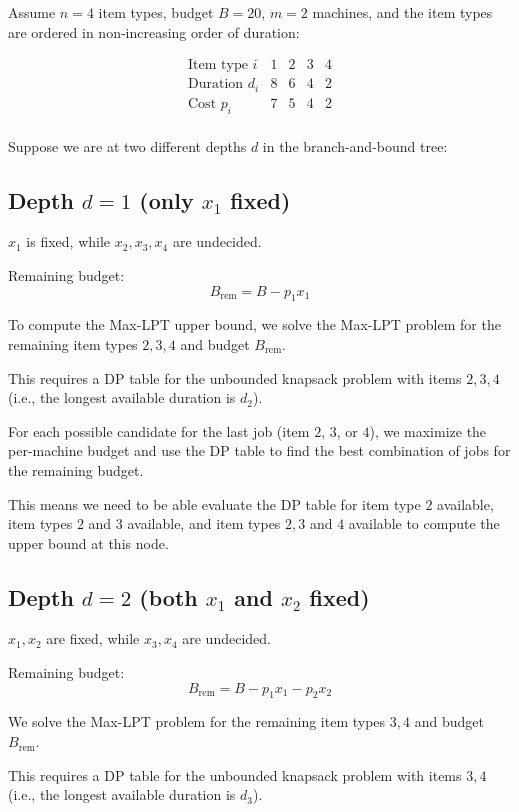 Assume $n = 4$ item types, budget $B = 20$, $m = 2$ machines, and the item types are ordered in non-increasing order of duration:

\[
\begin{array}{c|cccc}
\text{Item type } i & 1 & 2 & 3 & 4 \\
\hline
\text{Duration } d_i & 8 & 6 & 4 & 2 \\
\text{Cost } p_i & 7 & 5 & 4 & 2 \\
\end{array}
\]

Suppose we are at two different depths $d$ in the branch-and-bound tree:

\subsection*{Depth $d = 1$ (only $x_1$ fixed)}

$x_1$ is fixed, while $x_2, x_3, x_4$ are undecided.

Remaining budget:
\[
B_{\text{rem}} = B - p_1 x_1
\]

To compute the Max-LPT upper bound, we solve the Max-LPT problem for the remaining item types $2,3,4$ and budget $B_{\text{rem}}$.

This requires a DP table for the unbounded knapsack problem with items $2,3,4$ (i.e., the longest available duration is $d_2$).

For each possible candidate for the last job (item $2$, $3$, or $4$), we maximize the per-machine budget and use the DP table to find the best combination of jobs for the remaining budget.

This means we need to be able evaluate the DP table for item type $2$ available, item types $2$ and $3$ available, and item types $2, 3$ and $4$ available to compute the upper bound at this node.

\subsection*{Depth $d = 2$ (both $x_1$ and $x_2$ fixed)}

$x_1, x_2$ are fixed, while $x_3, x_4$ are undecided.

Remaining budget:
\[
B_{\text{rem}} = B - p_1 x_1 - p_2 x_2
\]

We solve the Max-LPT problem for the remaining item types $3,4$ and budget $B_{\text{rem}}$.

This requires a DP table for the unbounded knapsack problem with items $3,4$ (i.e., the longest available duration is $d_3$).

